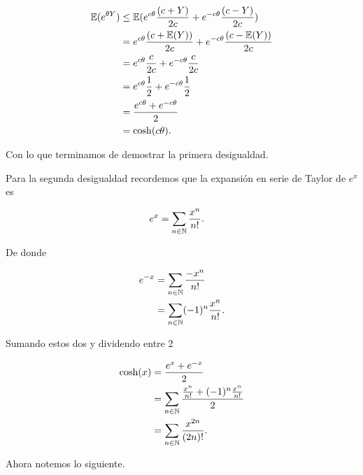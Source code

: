 \begin{align}
    \mathbb{E}(e^{\theta Y})    &\leq   \mathbb{E}(e^{c\theta} \frac{(c + Y)}{2c} + e^{-c\theta} \frac{(c - Y)}{2c})            \\
                        &=      e^{c\theta} \frac{(c + \mathbb{E}(Y))}{2c} + e^{-c\theta} \frac{(c - \mathbb{E}(Y))}{2c}        \\
                        &=      e^{c\theta} \frac{c}{2c} + e^{-c\theta} \frac{c}{2c}                            \\
                        &=      e^{c\theta} \frac{1}{2} + e^{-c\theta} \frac{1}{2}                              \\                       
                        &=      \frac{e^{c\theta} + e^{-c\theta}}{2}                                            \\
                        &=      \cosh(c \theta).
\end{align}\par\null

Con lo que terminamos de demostrar la primera desigualdad.

Para la segunda desigualdad recordemos que la expansión en serie de Taylor de $e^x$ es

\begin{align}
    e^x     &=  \sum_{n \in \mathbb{N}} \frac{x^{n}}{n!}.
\end{align}\par\null

De donde 

\begin{align}
    e^{-x}  &=  \sum_{n \in \mathbb{N}} \frac{-x^{n}}{n!}           \\
            &=  \sum_{n \in \mathbb{N}} (-1)^{n}\frac{x^{n}}{n!}.   
\end{align}\par\null

Sumando estos dos y dividendo entre 2

\begin{align}
    \cosh(x)    &=  \frac{e^x + e^{-x}}{2}                                                  \\
                &=  \sum_{n \in \mathbb{N}} \frac{\frac{x^{n}}{n!} + (-1)^{n}\frac{x^{n}}{n!}}{2}   \\
                &=  \sum_{n \in \mathbb{N}} \frac{x^{2n}}{(2n)!}. \label{problema2_3:expansion_en_serie_de_taylor}
\end{align}\par\null

Ahora notemos lo siguiente.

